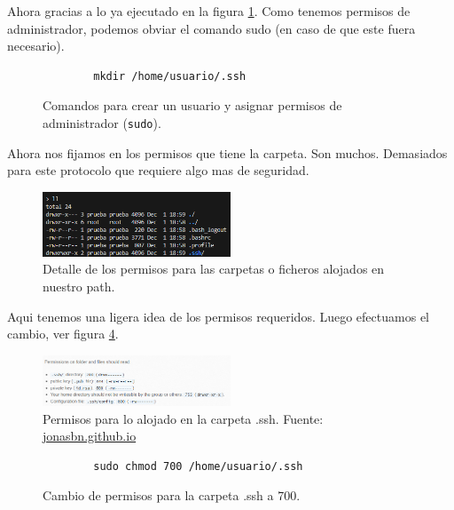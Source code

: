 Ahora gracias a lo ya ejecutado en la figura \ref{fig:adduser-sudo}. Como tenemos permisos de administrador, podemos
obviar el comando sudo (en caso de que este fuera necesario).

\begin{figure}[h!]
    \centering
    \begin{verbatim}
        mkdir /home/usuario/.ssh
    \end{verbatim}
    \caption{Comandos para crear un usuario y asignar permisos de administrador (\texttt{sudo}).}
    \label{fig:adduser-sudo}
\end{figure}

Ahora nos fijamos en los permisos que tiene la carpeta. Son muchos. Demasiados para este protocolo que requiere algo mas de seguridad.

\begin{figure}[h!]
    \centering
    \includegraphics[width=0.5\textwidth]{imagenes/ll_ssh.png}
    \caption[Detalle de los permisos para las carpetas o ficheros alojados en nuestro path.]{Detalle de los permisos para las carpetas o ficheros alojados en nuestro path.}
    \label{fig:ll_ssh}
\end{figure}

Aqui tenemos una ligera idea de los permisos requeridos. Luego efectuamos el cambio, ver figura \ref{fig:cambio_permisos_ssh}.

\begin{figure}[h!]
    \centering
    \includegraphics[width=0.5\textwidth]{imagenes/permisos_ssh.png}
    \caption[Permisos para lo alojado en la carpeta .ssh. Fuente: \href{https://jonasbn.github.io/til/ssh/permissions\_on\_ssh\_folder\_and\_files.html}{jonasbn.github.io}]{Permisos para lo alojado en la carpeta .ssh. Fuente: \href{https://jonasbn.github.io/til/ssh/permissions\_on\_ssh\_folder\_and\_files.html}{jonasbn.github.io}}
    \label{fig:permisos_ssh}
\end{figure}

\begin{figure}[h!]
    \centering
    \begin{verbatim}
        sudo chmod 700 /home/usuario/.ssh
    \end{verbatim}
    \caption{Cambio de permisos para la carpeta .ssh a 700.}
    \label{fig:cambio_permisos_ssh}
\end{figure}

